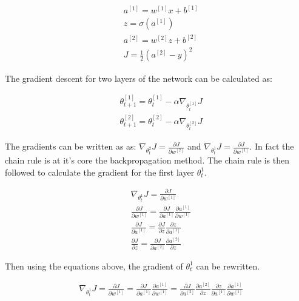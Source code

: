 \begin{align}
& a^{[1]} = w^{[1]}x + b^{[1]}\\
& z = \sigma(a^{[1]}) \\
& a^{[2]} = w^{[2]}z + b^{[2]}\\
& J = \frac{1}{2} (a^{[2]} - y)^{2}
\end{align}

The gradient descent for two layers of the network can be calculated as:

\begin{align}
  & \theta^{[1]}_{t+1} = \theta^{[1]}_{t} - \alpha \nabla_{\theta^{[1]}_{t}}J\\
& \theta^{[2]}_{t+1} = \theta^{[2]}_{t} - \alpha \nabla_{\theta^{[2]}_{t}}J 
\end{align}

The gradients can be written as as: $\nabla_{\theta^{2}_{t}}J = \frac{\partial J}{\partial w^{[2]}} $ and $\nabla_{\theta^{1}_{t}}J = \frac{\partial J}{\partial w^{[1]}}$. In fact the chain rule is at it's core the backpropagation method. The chain rule is then followed to calculate the gradient for the first layer $\theta^{1}_{t}$.

\begin{align}
&  \nabla_{\theta^{1}_{t}}J = \frac{\partial J}{\partial w^{[1]}} \\
&  \frac{\partial J}{\partial w^{[1]}} = \frac{\partial J}{\partial a^{[1]}}\frac{\partial a^{[1]}}{\partial w^{[1]}} \\
&  \frac{\partial J}{\partial a^{[1]}}  =\frac{\partial J}{\partial z}\frac{\partial z}{\partial a^{[1]}} \\
&  \frac{\partial J}{\partial z} = \frac{\partial J}{\partial a^{[2]}}\frac{\partial a^{[2]}}{\partial z}
\end{align}

Then using the equations above, the gradient of $\theta^{1}_{t}$ can be rewritten.


\begin{align}
&  \nabla_{\theta^{1}_{t}}J = \frac{\partial J}{\partial w^{[1]}} = \frac{\partial J}{\partial a^{[1]}}\frac{\partial a^{[1]}}{\partial w^{[1]}} = \frac{\partial J}{\partial a^{[2]}}\frac{\partial a^{[2]}}{\partial z}\frac{\partial z}{\partial a^{[1]}}\frac{\partial a^{[1]}}{\partial w^{[1]}} \\
\end{align}

